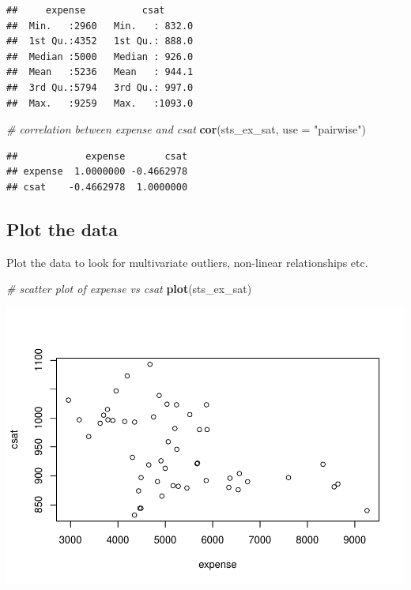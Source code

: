 \documentclass[]{book}
\newenvironment{Shaded}{\begin{snugshade}}{\end{snugshade}}
\newcommand{\CommentTok}[1]{\textcolor[rgb]{0.56,0.35,0.01}{\textit{#1}}}
\newcommand{\DataTypeTok}[1]{\textcolor[rgb]{0.13,0.29,0.53}{#1}}
\newcommand{\KeywordTok}[1]{\textcolor[rgb]{0.13,0.29,0.53}{\textbf{#1}}}
\newcommand{\NormalTok}[1]{#1}
\newcommand{\StringTok}[1]{\textcolor[rgb]{0.31,0.60,0.02}{#1}}
\begin{document}
\begin{verbatim}
##     expense          csat       
##  Min.   :2960   Min.   : 832.0  
##  1st Qu.:4352   1st Qu.: 888.0  
##  Median :5000   Median : 926.0  
##  Mean   :5236   Mean   : 944.1  
##  3rd Qu.:5794   3rd Qu.: 997.0  
##  Max.   :9259   Max.   :1093.0
\end{verbatim}

\begin{Shaded}
\begin{Highlighting}[]
  \CommentTok{# correlation between expense and csat}
  \KeywordTok{cor}\NormalTok{(sts_ex_sat, }\DataTypeTok{use =} \StringTok{"pairwise"}\NormalTok{) }
\end{Highlighting}
\end{Shaded}

\begin{verbatim}
##            expense       csat
## expense  1.0000000 -0.4662978
## csat    -0.4662978  1.0000000
\end{verbatim}

\hypertarget{plot-the-data}{%
\subsection{Plot the data}\label{plot-the-data}}

Plot the data to look for multivariate outliers, non-linear relationships etc.

\begin{Shaded}
\begin{Highlighting}[]
  \CommentTok{# scatter plot of expense vs csat}
  \KeywordTok{plot}\NormalTok{(sts_ex_sat)}
\end{Highlighting}
\end{Shaded}

\includegraphics{R/Rmodels/figures/unnamed-chunk-83-1.pdf}
\end{document}
